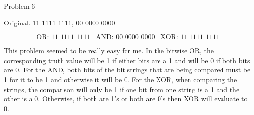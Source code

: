 \begin{problem}{Problem 6}
    \begin{highlight}
        Original: 11 1111 1111, 00 0000 0000

        \begin{equation}
            \text{OR: 11 1111 1111} \hspace{10pt} \text{AND: 00 0000 0000} \hspace{10pt} \text{XOR: 11 1111 1111}
        \end{equation}
    \end{highlight}

    \begin{highlight}
        This problem seemed to be really easy for me. In the bitwise OR, the corresponding truth value will be 1 if either bits are a 1 and will be 0 if both bits are 0. For the AND, both bits of the bit strings that are being 
        compared must be 1 for it to be 1 and otherwise it will be 0. For the XOR, when comparing the strings, the comparison will only be 1 if one bit from one string is a 1 and the other is a 0. Otherwise, if both are 1's or 
        both are 0's then XOR will evaluate to 0.
    \end{highlight}
\end{problem}

